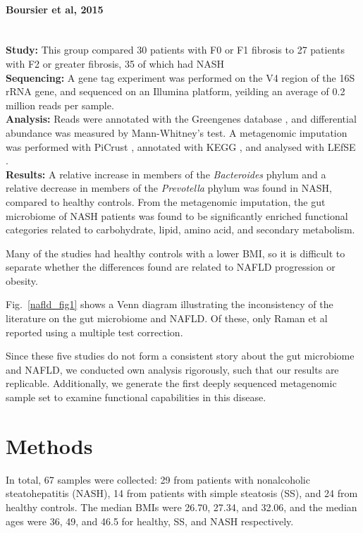 \paragraph{Boursier et al, 2015 \cite{boursier2016severity}}\mbox{}\\
\textbf{Study:} This group compared 30 patients with F0 or F1 fibrosis to 27 patients with F2 or greater fibrosis, 35 of which had NASH\\
\textbf{Sequencing:} A gene tag experiment was performed on the V4 region of the 16S rRNA gene, and sequenced on an Illumina platform, yeilding an average of 0.2 million reads per sample.\\
\textbf{Analysis:} Reads were annotated with the Greengenes database \cite{desantis2006greengenes}, and differential abundance was measured by Mann-Whitney's test. A metagenomic imputation was performed with PiCrust \cite{langille2013predictive}, annotated with KEGG \cite{kanehisa2000kegg}, and analysed with LEfSE \cite{segata2011metagenomic}.\\
\textbf{Results:} A relative increase in members of the \textit{Bacteroides} phylum and a relative decrease in members of the \textit{Prevotella} phylum was found in NASH, compared to healthy controls. From the metagenomic imputation, the gut microbiome of NASH patients was found to be significantly enriched functional categories related to carbohydrate, lipid, amino acid, and secondary metabolism.

Many of the studies had healthy controls with a lower BMI, so it is difficult to separate whether the differences found are related to NAFLD progression or obesity.

Fig.~\ref{nafld_fig1} shows a Venn diagram illustrating the inconsistency of the literature on the gut microbiome and NAFLD. Of these, only Raman et al \cite{raman2013fecal} reported using a multiple test correction.

Since these five studies do not form a consistent story about the gut microbiome and NAFLD, we conducted own analysis rigorously, such that our results are replicable. Additionally, we generate the first deeply sequenced metagenomic sample set to examine functional capabilities in this disease.

\FloatBarrier

\section{Methods}
In total, 67 samples were collected: 29 from patients with nonalcoholic steatohepatitis (NASH), 14 from patients with simple steatosis (SS), and 24 from healthy controls. The median BMIs were 26.70, 27.34, and 32.06, and the median ages were 36, 49, and 46.5 for healthy, SS, and NASH respectively.

